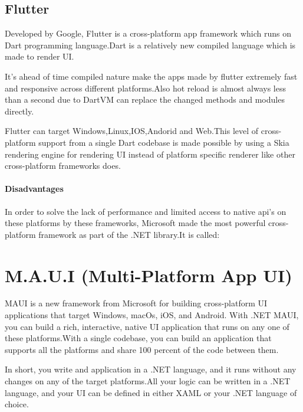 \documentclass[14pt]{extarticle}
\begin{document}
\newpage
\subsection{Flutter}

\parbox{\linewidth}{
    \setlength{\parskip}{1em}
    Developed by Google, Flutter is a cross-platform app framework which runs on Dart programming language.Dart is a relatively new compiled language which is made to render UI.

    It's ahead of time compiled nature make the apps made by flutter extremely fast and responsive across different platforms.Also hot reload is almost always less than a second due to DartVM can replace the changed methods and modules directly.

    Flutter can target Windows,Linux,IOS,Andorid and Web.This level of cross-platform support from a single Dart codebase is made possible by using a Skia rendering engine for rendering UI instead of platform specific renderer like other cross-platform frameworks does.
}
\vfil

\paragraph{Disadvantages}

\newpage
In order to solve the lack of performance and limited access to native api's on these platforms by these frameworks, Microsoft made the most powerful cross-platform framework as part of the .NET library.It is called:

\section{
  M.A.U.I (Multi-Platform App UI)
 }

\parbox{\linewidth}{
    \setlength{\parskip}{1em}

    MAUI is a new framework from Microsoft for building cross-platform UI applications that target Windows, macOs, iOS, and Android. With .NET MAUI, you can build a rich, interactive, native UI application that runs on any one of these platforms.With a single codebase, you can build an application that supports all the platforms and share 100 percent of the code between them.

    In short, you write and application in a .NET language, and it runs without any changes on any of the target platforms.All your logic can be written in a .NET language, and your UI can be defined in either XAML or your .NET language of choice.
}
\end{document}
